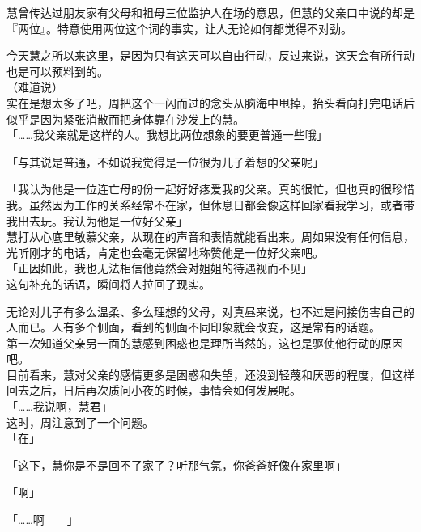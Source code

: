 慧曾传达过朋友家有父母和祖母三位监护人在场的意思，但慧的父亲口中说的却是『两位』。特意使用两位这个词的事实，让人无论如何都觉得不对劲。

今天慧之所以来这里，是因为只有这天可以自由行动，反过来说，这天会有所行动也是可以预料到的。\\

（难道说）\\

实在是想太多了吧，周把这个一闪而过的念头从脑海中甩掉，抬头看向打完电话后似乎是因为紧张消散而把身体靠在沙发上的慧。\\

「……我父亲就是这样的人。我想比两位想象的要更普通一些哦」

「与其说是普通，不如说我觉得是一位很为儿子着想的父亲呢」

「我认为他是一位连亡母的份一起好好疼爱我的父亲。真的很忙，但也真的很珍惜我。虽然因为工作的关系经常不在家，但休息日都会像这样回家看我学习，或者带我出去玩。我认为他是一位好父亲」\\

慧打从心底里敬慕父亲，从现在的声音和表情就能看出来。周如果没有任何信息，光听刚才的电话，肯定也会毫无保留地称赞他是一位好父亲吧。\\

「正因如此，我也无法相信他竟然会对姐姐的待遇视而不见」\\

这句补充的话语，瞬间将人拉回了现实。

无论对儿子有多么温柔、多么理想的父母，对真昼来说，也不过是间接伤害自己的人而已。人有多个侧面，看到的侧面不同印象就会改变，这是常有的话题。\\

第一次知道父亲另一面的慧感到困惑也是理所当然的，这也是驱使他行动的原因吧。\\

目前看来，慧对父亲的感情更多是困惑和失望，还没到轻蔑和厌恶的程度，但这样回去之后，日后再次质问小夜的时候，事情会如何发展呢。\\

「……我说啊，慧君」\\

这时，周注意到了一个问题。\\

「在」

「这下，慧你是不是回不了家了？听那气氛，你爸爸好像在家里啊」

「啊」

「……啊——」\\

